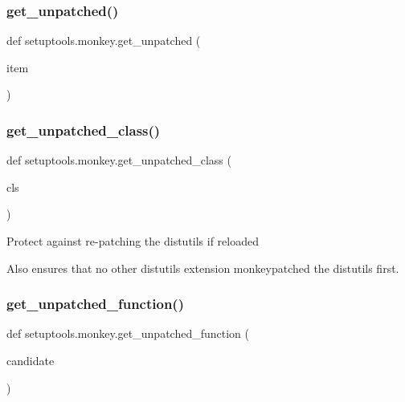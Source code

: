 \subsubsection{\texorpdfstring{get\+\_\+unpatched()}{get\_unpatched()}}
{\footnotesize\ttfamily def setuptools.\+monkey.\+get\+\_\+unpatched (\begin{DoxyParamCaption}\item[{}]{item }\end{DoxyParamCaption})}

\mbox{\label{namespacesetuptools_1_1monkey_ad46b685f3cc7245cde194b4b7831b38a}} 
\subsubsection{\texorpdfstring{get\+\_\+unpatched\+\_\+class()}{get\_unpatched\_class()}}
{\footnotesize\ttfamily def setuptools.\+monkey.\+get\+\_\+unpatched\+\_\+class (\begin{DoxyParamCaption}\item[{}]{cls }\end{DoxyParamCaption})}

\begin{DoxyVerb}Protect against re-patching the distutils if reloaded

Also ensures that no other distutils extension monkeypatched the distutils
first.
\end{DoxyVerb}
 \mbox{\label{namespacesetuptools_1_1monkey_a394451d3a77b5f2ff32bc108d7b677d4}} 
\subsubsection{\texorpdfstring{get\+\_\+unpatched\+\_\+function()}{get\_unpatched\_function()}}
{\footnotesize\ttfamily def setuptools.\+monkey.\+get\+\_\+unpatched\+\_\+function (\begin{DoxyParamCaption}\item[{}]{candidate }\end{DoxyParamCaption})}

